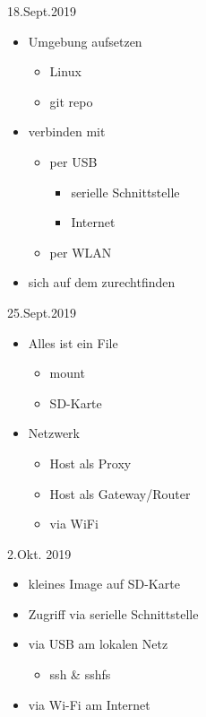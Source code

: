 \documentclass{beamer}
\begin{document}
\begin{frame}{18.Sept.2019}
\begin{itemize}
 \item Umgebung aufsetzen
 \begin{itemize}
  \item Linux
  \item git repo
 \end{itemize}
\item \target verbinden mit \host
 \begin{itemize}
  \item per USB
  \begin{itemize}
   \item serielle Schnittstelle 
   \item Internet
  \end{itemize}
  \item per WLAN
 \end{itemize}
\item sich auf dem \target zurechtfinden
\end{itemize}
\end{frame}

\begin{frame}{25.Sept.2019}
 \begin{itemize}
  \item Alles ist ein File
  \begin{itemize}
   \item {} mount
   \item {} SD-Karte
  \end{itemize}
  \item Netzwerk
  \begin{itemize}
   \item Host als Proxy
   \item Host als Gateway/Router
   \item \targetS via WiFi
  \end{itemize}
 \end{itemize}
\end{frame}

\begin{frame}{2.Okt. 2019}
 \begin{itemize}
  \item \targetS kleines Image auf SD-Karte
  \item Zugriff via serielle Schnittstelle
  \item via USB am lokalen Netz
  \begin{itemize}
    \item ssh \& sshfs
  \end{itemize}
  \item via Wi-Fi am Internet
 \end{itemize}
\end{frame}
\end{document}
